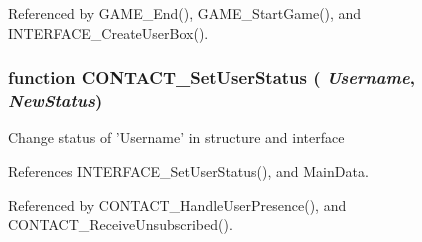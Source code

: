 Referenced by GAME\_\-End(), GAME\_\-StartGame(), and INTERFACE\_\-CreateUserBox().
\subsubsection{\setlength{\rightskip}{0pt plus 5cm}function CONTACT\_\-SetUserStatus ( {\em Username}, \/   {\em NewStatus})}\label{status_8js_7682d4a0f76bd4f6c8cd0be463dbf461}


Change status of 'Username' in structure and interface 

References INTERFACE\_\-SetUserStatus(), and MainData.

Referenced by CONTACT\_\-HandleUserPresence(), and CONTACT\_\-ReceiveUnsubscribed().